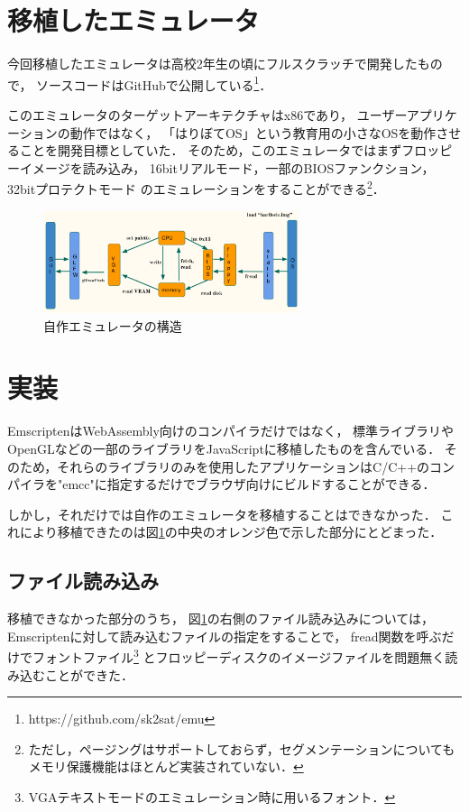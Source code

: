 \documentclass[a4j,10pt]{jsarticle}
\begin{document}
\section{移植したエミュレータ}
今回移植したエミュレータは高校2年生の頃にフルスクラッチで開発したもので，
ソースコードはGitHubで公開している\footnote{https://github.com/sk2sat/emu}．

このエミュレータのターゲットアーキテクチャはx86であり，
ユーザーアプリケーションの動作ではなく，
「はりぼてOS」という教育用の小さなOSを動作させることを開発目標としていた．
そのため，このエミュレータではまずフロッピーイメージを読み込み，
16bitリアルモード，一部のBIOSファンクション，32bitプロテクトモード
のエミュレーションをすることができる\footnote{ただし，ページングはサポートしておらず，セグメンテーションについてもメモリ保護機能はほとんど実装されていない．}．

\begin{figure}[htbp]
	\begin{center}
		\includegraphics[width=7.5cm]{./emu_struct.png}
		\caption{自作エミュレータの構造}
		\label{emustruct}
	\end{center}
\end{figure}

\section{実装}
EmscriptenはWebAssembly向けのコンパイラだけではなく，
標準ライブラリやOpenGLなどの一部のライブラリをJavaScriptに移植したものを含んでいる．
そのため，それらのライブラリのみを使用したアプリケーションはC/C++のコンパイラを"emcc"に指定するだけでブラウザ向けにビルドすることができる．

しかし，それだけでは自作のエミュレータを移植することはできなかった．
これにより移植できたのは図\ref{emustruct}の中央のオレンジ色で示した部分にとどまった．

\subsection{ファイル読み込み}
移植できなかった部分のうち，
図\ref{emustruct}の右側のファイル読み込みについては，
Emscriptenに対して読み込むファイルの指定をすることで，
fread関数を呼ぶだけでフォントファイル\footnote{VGAテキストモードのエミュレーション時に用いるフォント．}
とフロッピーディスクのイメージファイルを問題無く読み込むことができた．
\end{document}
